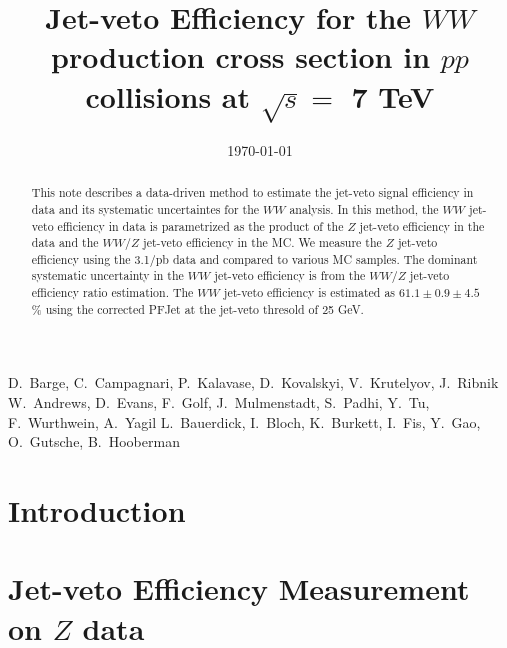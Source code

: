 \documentclass{cmspaper}
\begin{document}
%
\begin{titlepage}
\date{\today}

\title{Jet-veto Efficiency for the $WW$ production cross section in $pp$ collisions at $\sqrt{s}=$ 7 TeV}

\begin{Authlist}
D.~Barge, C.~Campagnari, P.~Kalavase, D.~Kovalskyi, V.~Krutelyov, J.~Ribnik
 W.~Andrews, D.~Evans, F.~Golf, J.~Mulmenstadt, S.~Padhi, Y.~Tu, F.~Wurthwein, A.~Yagil
L.~Bauerdick, I.~Bloch, K.~Burkett, I.~Fis, Y.~Gao, O.~Gutsche, B.~Hooberman
\end{Authlist}

\begin{abstract}

This note describes a data-driven method to estimate the jet-veto signal 
efficiency in data and its systematic uncertaintes for the $WW$ analysis. 
In this method, the $WW$ jet-veto efficiency in data is parametrized 
as the product of the $Z$ jet-veto efficiency in the data and 
the $WW/Z$ jet-veto efficiency in the MC. 
We measure the $Z$ jet-veto efficiency using the 3.1/pb data and compared 
to various MC samples. The dominant systematic uncertainty in the 
$WW$ jet-veto efficiency is from the $WW/Z$ jet-veto efficiency ratio 
estimation. The $WW$ jet-veto efficiency is estimated as $61.1\pm0.9\pm4.5$ 
\% using the corrected PFJet at the jet-veto thresold of 25 GeV. 


\end{abstract}
\end{titlepage}

\setcounter{page}{2}%
\tableofcontents


\section {Introduction}
\label{sec:intro}


\section {Jet-veto Efficiency Measurement on $Z$ data}
\label{sec:zeff}

\clearpage
\end{document}
